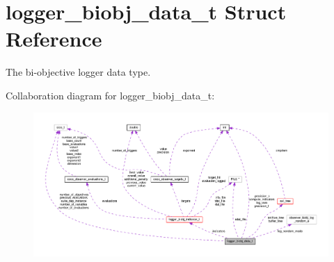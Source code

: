 \hypertarget{structlogger__biobj__data__t}{}\section{logger\+\_\+biobj\+\_\+data\+\_\+t Struct Reference}
\label{structlogger__biobj__data__t}


The bi-\/objective logger data type.  




Collaboration diagram for logger\+\_\+biobj\+\_\+data\+\_\+t\+:\nopagebreak
\begin{figure}[H]
\begin{center}
\leavevmode
\includegraphics[width=350pt]{structlogger__biobj__data__t__coll__graph}
\end{center}
\end{figure}
